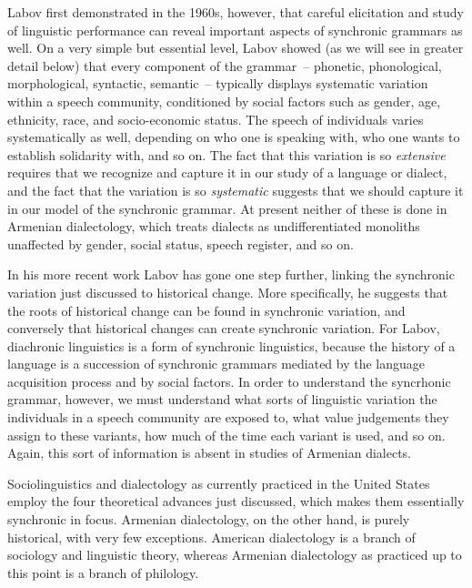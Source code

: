\documentclass[output=paper]{langscibook}
\begin{document}
Labov first demonstrated in the 1960s, however, that careful elicitation and study of linguistic performance can reveal important aspects of synchronic grammars as well. On a very simple but essential level, Labov showed (as we will see in greater detail below) that every component of the grammar~– phonetic, phonological, morphological, syntactic, semantic~– typically displays systematic variation within a speech community, conditioned by social factors such as gender, age, ethnicity, race, and socio-economic status. The speech of individuals varies systematically as well, depending on who one is speaking with, who one wants to establish solidarity with, and so on. The fact that this variation is so \textit{extensive} requires that we recognize and capture it in our study of a language or dialect, and the fact that the variation is so \textit{systematic} suggests that we should capture it in our model of the synchronic grammar. At present neither of these is done in Armenian dialectology, which treats dialects as undifferentiated monoliths unaffected by gender, social status, speech register, and so on.


In his more recent work Labov has gone one step further, linking the synchronic variation just discussed to historical change. More specifically, he suggests that the roots of historical change can be found in synchronic variation, and conversely that historical changes can create synchronic variation. For Labov, diachronic linguistics is a form of synchronic linguistics, because the history of a language is a succession of synchronic grammars mediated by the language acquisition process and by social factors. In order to understand the syncrhonic grammar, however, we must understand what sorts of linguistic variation the individuals in a speech community are exposed to, what value judgements they assign to these variants, how much of the time each variant is used, and so on. Again, this sort of information is absent in studies of Armenian dialects.

Sociolinguistics and dialectology as currently practiced in the United States employ the four theoretical advances just discussed, which makes them essentially synchronic in focus. Armenian dialectology, on the other hand, is purely historical, with very few exceptions. American dialectology is a branch of sociology and linguistic theory, whereas Armenian dialectology as practiced up to this point is a branch of philology.
\end{document}
